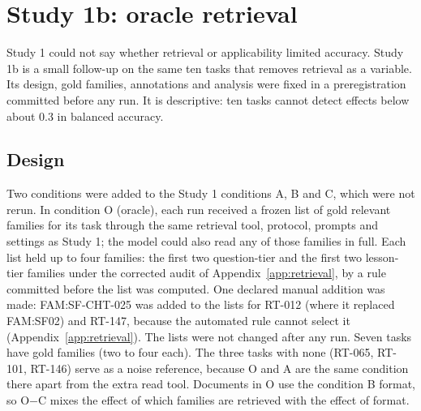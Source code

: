 
\section{Study 1b: oracle retrieval}
\label{sec:study1b}

Study 1 could not say whether retrieval or applicability limited accuracy. Study 1b is a small follow-up on the same ten tasks that removes retrieval as a variable. Its design, gold families, annotations and analysis were fixed in a preregistration committed before any run. It is descriptive: ten tasks cannot detect effects below about 0.3 in balanced accuracy.

\subsection{Design}

Two conditions were added to the Study 1 conditions A, B and C, which were not rerun. In condition O (oracle), each run received a frozen list of gold relevant families for its task through the same retrieval tool, protocol, prompts and settings as Study 1; the model could also read any of those families in full. Each list held up to four families: the first two question-tier and the first two lesson-tier families under the corrected audit of Appendix~\ref{app:retrieval}, by a rule committed before the list was computed. One declared manual addition was made: FAM:SF-CHT-025 was added to the lists for RT-012 (where it replaced FAM:SF02) and RT-147, because the automated rule cannot select it (Appendix~\ref{app:retrieval}). The lists were not changed after any run. Seven tasks have gold families (two to four each). The three tasks with none (RT-065, RT-101, RT-146) serve as a noise reference, because O and A are the same condition there apart from the extra read tool. Documents in O use the condition B format, so O$-$C mixes the effect of which families are retrieved with the effect of format.

